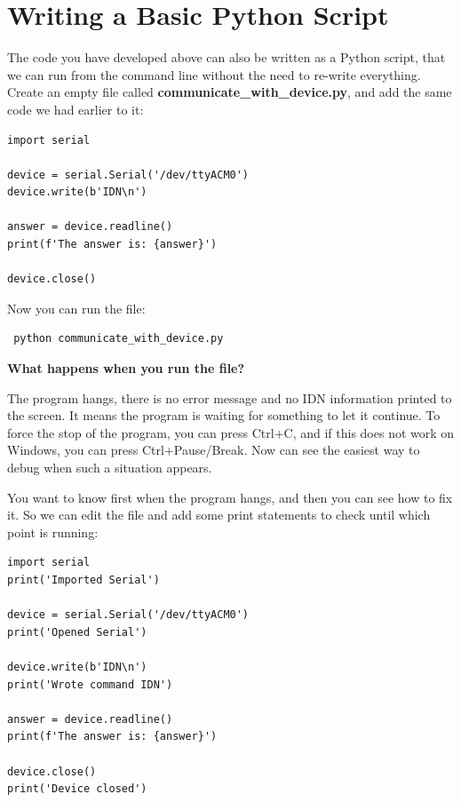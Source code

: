 \section{Writing a Basic Python Script}\label{sec:basic-python-script}
The code you have developed above can also be written as a Python script, that we can run from the command line without the need to re-write everything. Create an empty file called \textbf{communicate\_with\_device.py}, and add the same code we had earlier to it:

\begin{verbatim}
import serial

device = serial.Serial('/dev/ttyACM0')
device.write(b'IDN\n')

answer = device.readline()
print(f'The answer is: {answer}')

device.close()
\end{verbatim}

Now you can run the file:

\begin{verbatim}
 python communicate_with_device.py
\end{verbatim}


\textbf{What happens when you run the file?}

The program hangs, there is no error message and no IDN information printed to the screen. It means the program is waiting for something to let it continue. To force the stop of the program, you can press Ctrl+C, and if this does not work on Windows, you can press Ctrl+Pause/Break. Now can see the easiest way to debug when such a situation appears.

You want to know first when the program hangs, and then you can see how to fix it. So we can edit the file and add some print statements to check until which point is running:

\begin{verbatim}
import serial
print('Imported Serial')

device = serial.Serial('/dev/ttyACM0')
print('Opened Serial')

device.write(b'IDN\n')
print('Wrote command IDN')

answer = device.readline()
print(f'The answer is: {answer}')

device.close()
print('Device closed')
\end{verbatim}

